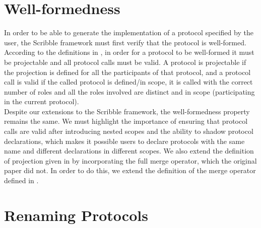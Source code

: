 \documentclass[12pt,twoside]{report}
\begin{document}
\section{Well-formedness}
In order to be able to generate the implementation of a protocol specified by the user, the Scribble framework must first verify that the protocol is well-formed.\\ According to the definitions in \cite{featherweight, nestedprotocols}, in order for a protocol to be well-formed it must be projectable and all protocol calls must be valid. A protocol is projectable if the projection is defined for all the participants of that protocol, and a protocol call is valid if the called protocol is defined/in scope, it is called with the correct number of roles and all the roles involved are distinct and in scope (participating in the current protocol).\\

Despite our extensions to the Scribble framework, the well-formedness property remains the same. We must highlight the importance of ensuring that protocol calls are valid after introducing nested scopes and the ability to shadow protocol declarations, which makes it possible users to declare protocols with the same name and different declarations in different scopes. We also extend the definition of projection given in \cite{nestedprotocols} by incorporating the full merge operator, which the original paper did not. In order to do this, we extend the definition of the merge operator defined in \cite{featherweight}.


\section{Renaming Protocols}\label{renaming}
\end{document}
